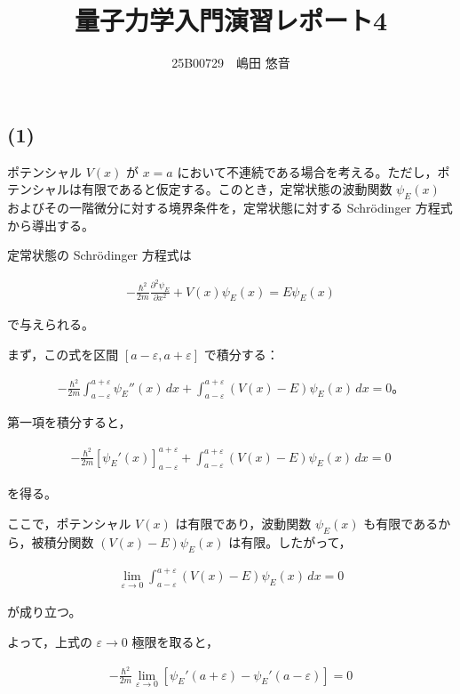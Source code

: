 \documentclass[platex,dvipdfmx,a4paper]{jsarticle}
\title{量子力学入門演習レポート4}
\author{25B00729　嶋田 悠音}
\newcommand{\nhb}[3]{\frac{\partial^{#1} #2}{\partial #3^{#1}}}
\begin{document}
\maketitle
\subsection*{(1)}

ポテンシャル $V(x)$ が $x=a$ において不連続である場合を考える。ただし，ポテンシャルは有限であると仮定する。このとき，定常状態の波動関数 $\psi_E(x)$ およびその一階微分に対する境界条件を，定常状態に対する Schr\"odinger 方程式から導出する。

定常状態の Schr\"odinger 方程式は

\begin{align*}
-\frac{\hbar^2}{2m}\nhb{2}{\psi_E}{x}
+V(x)\psi_E(x)
=
E\psi_E(x)
\end{align*}

で与えられる。

まず，この式を区間 $[a-\varepsilon,a+\varepsilon]$ で積分する：

\begin{align*}
-\frac{\hbar^2}{2m}
\int_{a-\varepsilon}^{a+\varepsilon}
\psi_E''(x)\,dx
+
\int_{a-\varepsilon}^{a+\varepsilon}
(V(x)-E)\psi_E(x)\,dx
=
0。
\end{align*}

第一項を積分すると，

\begin{align*}
-\frac{\hbar^2}{2m}
\left[
\psi_E'(x)
\right]_{a-\varepsilon}^{a+\varepsilon}
+
\int_{a-\varepsilon}^{a+\varepsilon}
(V(x)-E)\psi_E(x)\,dx
=
0
\end{align*}

を得る。

ここで，ポテンシャル $V(x)$ は有限であり，波動関数 $\psi_E(x)$ も有限であるから，被積分関数
$(V(x)-E)\psi_E(x)$
は有限。したがって，

\begin{align*}
\lim_{\varepsilon\to0}
\int_{a-\varepsilon}^{a+\varepsilon}
(V(x)-E)\psi_E(x)\,dx
=
0
\end{align*}

が成り立つ。

よって，上式の $\varepsilon\to0$ 極限を取ると，

\begin{align*}
-\frac{\hbar^2}{2m}
\lim_{\varepsilon\to0}
\left[
\psi_E'(a+\varepsilon)
-\psi_E'(a-\varepsilon)
\right]
=
0
\end{align*}
\end{document}
